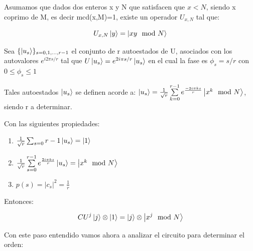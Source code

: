 Asumamos que dados dos enteros x y N que satisfacen que $x<N$, siendo x coprimo de M, es decir mcd(x,M)=1, existe un operador $U_{x,N}$ tal que:

\begin{equation}
    U_{x,N} \ket{y} = \ket{x y \mod N}
\end{equation}

Sea $\{ \ket{u_s}\}_{s = 0, 1, ..., r-1}$ el conjunto de r autoestados de U, asociados con los autovalores $e^{i 2 \pi s/r}$ tal que $U \ket{u_s} = e^{2 i \pi s /r} \ket{u_s}$ en el cual la fase es $\phi_s = s/r$ con $0 \leq \phi_s \leq 1$

Tales autoestados $\ket{u_s}$ se definen acorde a: $\ket{u_s} = \frac{1}{\sqrt{r}} \sum\limits_{k=0}^{r-1} e^{\frac{-2 i \pi k s}{r}} \ket{x^k \mod N}$, siendo r a determinar.

Con las siguientes propiedades:

\begin{enumerate}
    \item $\frac{1}{\sqrt{r}} \sum_{s=0}{r-1} \ket{u_s} = \ket{1}$
    \item $\frac{1}{\sqrt{r}} \sum\limits_{s=0}^{r-1} e^{\frac{2 i \pi k s}{r}} \ket{u_s} = \ket{x^k \mod N}$
    \item $p(s) = |c_s|^2 = \frac{1}{r}$
\end{enumerate}

Entonces:

\begin{equation}
    CU^j \ket{j} \otimes \ket{1} = \ket{j} \otimes \ket{x^j \mod N}
\end{equation}

Con este paso entendido vamos ahora a analizar el circuito para determinar el orden:

